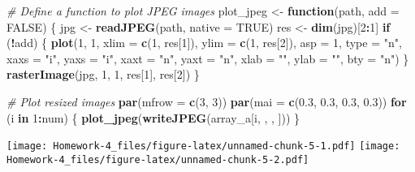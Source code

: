 \documentclass[
]{article}
\newenvironment{Shaded}{\begin{snugshade}}{\end{snugshade}}
\newcommand{\AttributeTok}[1]{\textcolor[rgb]{0.13,0.29,0.53}{#1}}
\newcommand{\CommentTok}[1]{\textcolor[rgb]{0.56,0.35,0.01}{\textit{#1}}}
\newcommand{\ConstantTok}[1]{\textcolor[rgb]{0.56,0.35,0.01}{#1}}
\newcommand{\ControlFlowTok}[1]{\textcolor[rgb]{0.13,0.29,0.53}{\textbf{#1}}}
\newcommand{\DecValTok}[1]{\textcolor[rgb]{0.00,0.00,0.81}{#1}}
\newcommand{\FloatTok}[1]{\textcolor[rgb]{0.00,0.00,0.81}{#1}}
\newcommand{\FunctionTok}[1]{\textcolor[rgb]{0.13,0.29,0.53}{\textbf{#1}}}
\newcommand{\NormalTok}[1]{#1}
\newcommand{\OtherTok}[1]{\textcolor[rgb]{0.56,0.35,0.01}{#1}}
\newcommand{\SpecialCharTok}[1]{\textcolor[rgb]{0.81,0.36,0.00}{\textbf{#1}}}
\newcommand{\StringTok}[1]{\textcolor[rgb]{0.31,0.60,0.02}{#1}}
\begin{document}
\begin{Shaded}
\begin{Highlighting}[]
\CommentTok{\# Define a function to plot JPEG images}
\NormalTok{plot\_jpeg }\OtherTok{\textless{}{-}} \ControlFlowTok{function}\NormalTok{(path, }\AttributeTok{add =} \ConstantTok{FALSE}\NormalTok{) \{}
\NormalTok{    jpg }\OtherTok{\textless{}{-}} \FunctionTok{readJPEG}\NormalTok{(path, }\AttributeTok{native =} \ConstantTok{TRUE}\NormalTok{)}
\NormalTok{    res }\OtherTok{\textless{}{-}} \FunctionTok{dim}\NormalTok{(jpg)[}\DecValTok{2}\SpecialCharTok{:}\DecValTok{1}\NormalTok{]}
    \ControlFlowTok{if}\NormalTok{ (}\SpecialCharTok{!}\NormalTok{add) \{}
        \FunctionTok{plot}\NormalTok{(}\DecValTok{1}\NormalTok{, }\DecValTok{1}\NormalTok{, }\AttributeTok{xlim =} \FunctionTok{c}\NormalTok{(}\DecValTok{1}\NormalTok{, res[}\DecValTok{1}\NormalTok{]), }\AttributeTok{ylim =} \FunctionTok{c}\NormalTok{(}\DecValTok{1}\NormalTok{, res[}\DecValTok{2}\NormalTok{]), }\AttributeTok{asp =} \DecValTok{1}\NormalTok{, }\AttributeTok{type =} \StringTok{"n"}\NormalTok{,}
            \AttributeTok{xaxs =} \StringTok{"i"}\NormalTok{, }\AttributeTok{yaxs =} \StringTok{"i"}\NormalTok{, }\AttributeTok{xaxt =} \StringTok{"n"}\NormalTok{, }\AttributeTok{yaxt =} \StringTok{"n"}\NormalTok{, }\AttributeTok{xlab =} \StringTok{""}\NormalTok{, }\AttributeTok{ylab =} \StringTok{""}\NormalTok{,}
            \AttributeTok{bty =} \StringTok{"n"}\NormalTok{)}
\NormalTok{    \}}
    \FunctionTok{rasterImage}\NormalTok{(jpg, }\DecValTok{1}\NormalTok{, }\DecValTok{1}\NormalTok{, res[}\DecValTok{1}\NormalTok{], res[}\DecValTok{2}\NormalTok{])}
\NormalTok{\}}

\CommentTok{\# Plot resized images}
\FunctionTok{par}\NormalTok{(}\AttributeTok{mfrow =} \FunctionTok{c}\NormalTok{(}\DecValTok{3}\NormalTok{, }\DecValTok{3}\NormalTok{))}
\FunctionTok{par}\NormalTok{(}\AttributeTok{mai =} \FunctionTok{c}\NormalTok{(}\FloatTok{0.3}\NormalTok{, }\FloatTok{0.3}\NormalTok{, }\FloatTok{0.3}\NormalTok{, }\FloatTok{0.3}\NormalTok{))}
\ControlFlowTok{for}\NormalTok{ (i }\ControlFlowTok{in} \DecValTok{1}\SpecialCharTok{:}\NormalTok{num) \{}
    \FunctionTok{plot\_jpeg}\NormalTok{(}\FunctionTok{writeJPEG}\NormalTok{(array\_a[i, , , ]))}
\NormalTok{\}}
\end{Highlighting}
\end{Shaded}

\texttt{[image: Homework-4\_files/figure-latex/unnamed-chunk-5-1.pdf]}
\texttt{[image: Homework-4\_files/figure-latex/unnamed-chunk-5-2.pdf]}
\end{document}
